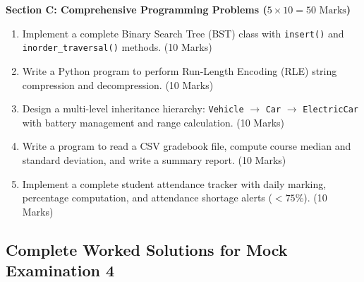 \begin{mockexam}
\medskip
\noindent\textbf{Section C: Comprehensive Programming Problems ($5 \times 10 = 50\text{ Marks}$)}
\begin{enumerate}[leftmargin=1.5em, start=17]
    \item Implement a complete Binary Search Tree (BST) class with \texttt{insert()} and \texttt{inorder\_traversal()} methods. (10 Marks)
    \item Write a Python program to perform Run-Length Encoding (RLE) string compression and decompression. (10 Marks)
    \item Design a multi-level inheritance hierarchy: \texttt{Vehicle} $\to$ \texttt{Car} $\to$ \texttt{ElectricCar} with battery management and range calculation. (10 Marks)
    \item Write a program to read a CSV gradebook file, compute course median and standard deviation, and write a summary report. (10 Marks)
    \item Implement a complete student attendance tracker with daily marking, percentage computation, and attendance shortage alerts ($<75\%$). (10 Marks)
\end{enumerate}
\end{mockexam}

\subsection{Complete Worked Solutions for Mock Examination 4}

